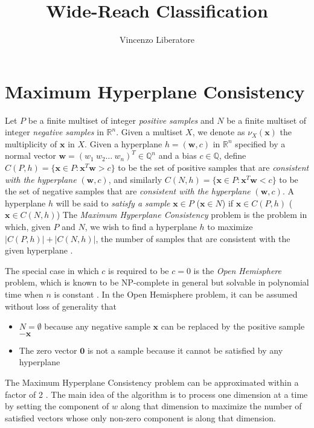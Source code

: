 \documentclass[11pt]{article}
\title{Wide-Reach Classification}
\author{Vincenzo Liberatore}
\theoremstyle{definition}
\newcommand{\R}{\mathbb{R}}
\newcommand{\Q}{\mathbb{Q}}
\newcommand{\vect}[1]{\mathbf{#1}}
\begin{document}
\maketitle

\section{Maximum Hyperplane Consistency}
Let $P$ be a finite multiset of integer {\em positive samples\/} and 
$N$ be a finite multiset of integer {\em negative samples\/} in $\R^n$.
Given a multiset $X$, we denote as $\nu_X(\vect{x})$ the multiplicity of $\vect{x}$ in $X$. 
Given a hyperplane $h = (\vect{w}, c)$ in $\R^n$ 
specified by a normal vector $\vect{w} = (w_1 ~ w_2 \dots ~ w_n)^T \in \Q^n$ and a bias $c \in \Q$,
define $C(P, h) = \{ \vect{x} \in P : \vect{x}^T \vect{w} > c \}$
to be the set of positive samples that are {\em consistent with the hyperplane\/} $(\vect{w}, c)$,
and similarly $C(N, h) = \{ \vect{x} \in P : \vect{x}^T \vect{w} < c \}$
to be the set of negative samples that are {\em consistent with the hyperplane\/} $(\vect{w}, c)$.
A hyperplane $h$ will be said to {\em satisfy a sample\/} 
$\vect{x} \in P$ ($\vect{x} \in N$)
if $\vect{x} \in C(P, h)$ ($\vect{x} \in C(N, h)$)
The {\em Maximum Hyperplane Consistency\/} problem is the problem in which,
given $P$ and $N$, we wish to find a hyperplane $h$
to maximize $|C(P, h)| + |C(N, h)|$, the number of samples 
that are consistent with the given hyperplane \cite{countingapprox}.


The special case in which $c$ is required to be $c = 0$ is the {\em Open Hemisphere\/} problem,
which is known to be NP-complete in general but solvable in polynomial time
when $n$ is constant \cite{densehemisphere}.
In the Open Hemisphere problem, it can be assumed without loss of generality that 
\begin{itemize} 
\item $N = \emptyset$ because 
any negative sample $\vect{x}$ can be replaced by the positive sample $-\vect{x}$
\item The zero vector $\vect{0}$ is not a sample because it cannot be satisfied by any hyperplane
\end{itemize}

The Maximum Hyperplane Consistency problem can be approximated within a factor of 2 \cite{countingapprox}.
The main idea of the algorithm is to process one dimension at a time 
by setting the component of $w$ along that dimension to maximize the number of satisfied vectors
whose only non-zero component is along that dimension.
\end{document}
